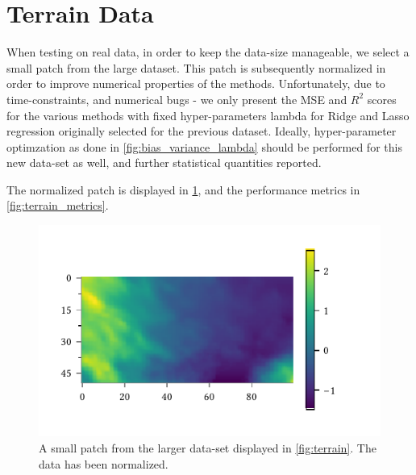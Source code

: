 \documentclass[dvipsnames, article, a4paper, oneside, 12pt]{memoir}
\begin{document}
  \section{Terrain Data}

  When testing on real data, in order to keep the data-size manageable, we
  select a small patch from the large dataset.  This patch is subsequently
  normalized in order to improve numerical properties of the methods.
  Unfortunately, due to time-constraints, and numerical bugs - we only present
  the MSE and \(R^2\) scores for the various methods with fixed
  hyper-parameters lambda for Ridge and Lasso regression originally selected
  for the previous dataset.  Ideally, hyper-parameter optimzation as done in
  \cref{fig:bias_variance_lambda} should be performed for this new data-set as
  well, and further statistical quantities reported.
  
  The normalized patch is displayed in \cref{fig:sub_terrain}, and the performance metrics in \cref{fig:terrain_metrics}.
  \begin{figure}[htpb]
  	\centering
  	\includegraphics[width=0.8\linewidth]{images/reduced_terrain_data.pdf}
	\caption{A small patch from the larger data-set displayed in \cref{fig:terrain}. The data has been normalized.}%
	\label{fig:sub_terrain}
  \end{figure}
\end{document}
